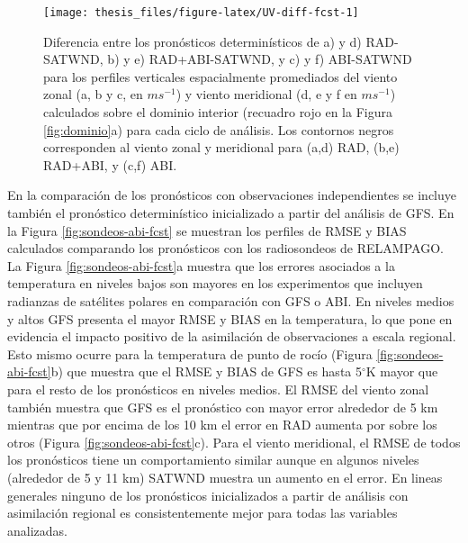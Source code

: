\documentclass[12pt,oneside,a4paper]{reedthesis}
\begin{document}
\begin{figure}

\texttt{[image: thesis\_files/figure-latex/UV-diff-fcst-1]} \hfill{}

\caption{Diferencia entre los pronósticos determinísticos de a) y d) RAD-SATWND, b) y e) RAD+ABI-SATWND, y c) y f) ABI-SATWND para los perfiles verticales espacialmente promediados del viento zonal (a, b y c, en \(ms^{-1}\)) y viento meridional (d, e y f en \(ms^{-1}\)) calculados sobre el dominio interior (recuadro rojo en la Figura \ref{fig:dominio}a) para cada ciclo de análisis. Los contornos negros corresponden al viento zonal y meridional para (a,d) RAD, (b,e) RAD+ABI, y (c,f) ABI.}\label{fig:UV-diff-fcst}
\end{figure}
En la comparación de los pronósticos con observaciones independientes se incluye también el pronóstico determinístico inicializado a partir del análisis de GFS. En la Figura \ref{fig:sondeos-abi-fcst} se muestran los perfiles de RMSE y BIAS calculados comparando los pronósticos con los radiosondeos de RELAMPAGO. La Figura \ref{fig:sondeos-abi-fcst}a muestra que los errores asociados a la temperatura en niveles bajos son mayores en los experimentos que incluyen radianzas de satélites polares en comparación con GFS o ABI. En niveles medios y altos GFS presenta el mayor RMSE y BIAS en la temperatura, lo que pone en evidencia el impacto positivo de la asimilación de observaciones a escala regional. Esto mismo ocurre para la temperatura de punto de rocío (Figura \ref{fig:sondeos-abi-fcst}b) que muestra que el RMSE y BIAS de GFS es hasta 5\(^\circ\)K mayor que para el resto de los pronósticos en niveles medios. El RMSE del viento zonal también muestra que GFS es el pronóstico con mayor error alrededor de 5 km mientras que por encima de los 10 km el error en RAD aumenta por sobre los otros (Figura \ref{fig:sondeos-abi-fcst}c). Para el viento meridional, el RMSE de todos los pronósticos tiene un comportamiento similar aunque en algunos niveles (alrededor de 5 y 11 km) SATWND muestra un aumento en el error. En lineas generales ninguno de los pronósticos inicializados a partir de análisis con asimilación regional es consistentemente mejor para todas las variables analizadas.
\end{document}
